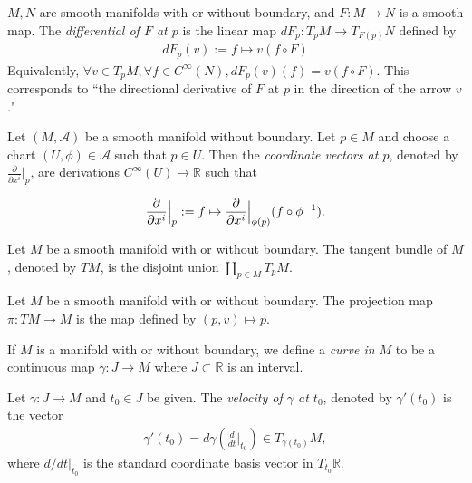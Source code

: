 \begin{defn}[Differential]
  $M, N$ are smooth manifolds with or without boundary, and $F: M \rightarrow N$ is a smooth map.
  The \textit{differential of $F$ at $p$} is the linear map $dF_p: T_pM \rightarrow T_{F(p)}N$ defined by 
  \begin{align*}
    dF_p(v) := f \mapsto v(f \circ F)
  \end{align*}
  Equivalently, $\forall v \in T_pM, \forall f \in C^{\infty}(N), dF_p(v)(f) = v(f \circ F)$.
  This corresponds to ``the directional derivative of $F$ at $p$ in the direction of the arrow $v$."
\end{defn}

\begin{defn}
  Let $(M, \mathcal{A})$ be a smooth manifold without boundary.
  Let $p \in M$ and choose a chart $(U, \phi) \in \mathcal{A}$ such that $p \in U$.
  Then the \textit{coordinate vectors at $p$}, denoted by $\frac{\partial}{\partial x^i}\vert_p$, are derivations $C^{\infty}(U) \rightarrow \mathbb{R}$ such that

  \begin{align*}
    \frac{\partial}{\partial x^i}\Big{\vert}_p := f \mapsto \frac{\partial}{\partial x^i}\Big{\vert}_{\phi(p)}(f \circ \phi^{-1}).
  \end{align*}
\end{defn}

\begin{defn}
  Let $M$ be a smooth manifold with or without boundary.
  The tangent bundle of $M$, denoted by $TM$, is the disjoint union $\coprod_{p \in M} T_pM$.
\end{defn}

\begin{defn}
  Let $M$ be a smooth manifold with or without boundary.
  The projection map $\pi: TM \rightarrow M$ is the map defined by $(p, v) \mapsto p$.
\end{defn}

\begin{defn}[Curve]
  If $M$ is a manifold with or without boundary, we define a \textit{curve in $M$} to be a continuous map $\gamma: J \rightarrow M$ where $J \subset \mathbb{R}$ is an interval.
\end{defn}

\begin{defn}
  Let $\gamma: J \rightarrow M$ and $t_0 \in J$ be given.
  The \textit{velocity of $\gamma$ at $t_0$}, denoted by $\gamma'(t_0)$ is the vector
  \begin{align*}
    \gamma'(t_0) = d\gamma(\frac{d}{dt}\Big\vert_{t_0}) \in T_{\gamma(t_0)}M,
  \end{align*}
  where $d/dt\vert_{t_0}$ is the standard coordinate basis vector in $T_{t_0}\mathbb{R}$.
\end{defn}


